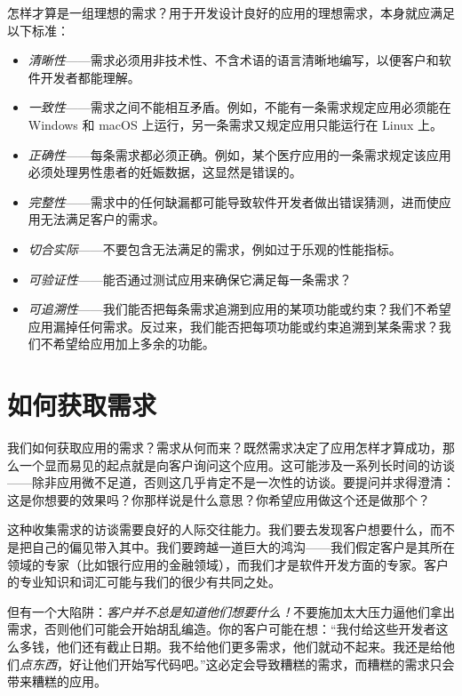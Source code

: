 怎样才算是一组理想的需求？用于开发设计良好的应用的理想需求，本身就应满足以下标准：

\begin{itemize}
\item \emph{清晰性}——需求必须用非技术性、不含术语的语言清晰地编写，以便客户和软件开发者都能理解。
\item \emph{一致性}——需求之间不能相互矛盾。例如，不能有一条需求规定应用必须能在 Windows 和 macOS 上运行，另一条需求又规定应用只能运行在 Linux 上。
\item \emph{正确性}——每条需求都必须正确。例如，某个医疗应用的一条需求规定该应用必须处理男性患者的妊娠数据，这显然是错误的。
\item \emph{完整性}——需求中的任何缺漏都可能导致软件开发者做出错误猜测，进而使应用无法满足客户的需求。
\item \emph{切合实际}——不要包含无法满足的需求，例如过于乐观的性能指标。
\item \emph{可验证性}——能否通过测试应用来确保它满足每一条需求？
\item \emph{可追溯性}——我们能否把每条需求追溯到应用的某项功能或约束？我们不希望应用漏掉任何需求。反过来，我们能否把每项功能或约束追溯到某条需求？我们不希望给应用加上多余的功能。
\end{itemize}


\section{如何获取需求}

我们如何获取应用的需求？需求从何而来？既然需求决定了应用怎样才算成功，那么一个显而易见的起点就是向客户询问这个应用。这可能涉及一系列长时间的访谈——除非应用微不足道，否则这几乎肯定不是一次性的访谈。要提问并求得澄清：这是你想要的效果吗？你那样说是什么意思？你希望应用做这个还是做那个？

这种收集需求的访谈需要良好的人际交往能力。我们要去发现客户想要什么，而不是把自己的偏见带入其中。我们要跨越一道巨大的鸿沟——我们假定客户是其所在领域的专家（比如银行应用的金融领域），而我们才是软件开发方面的专家。客户的专业知识和词汇可能与我们的很少有共同之处。

但有一个大陷阱：\emph{客户并不总是知道他们想要什么！}不要施加太大压力逼他们拿出需求，否则他们可能会开始胡乱编造。你的客户可能在想：“我付给这些开发者这么多钱，他们还有截止日期。我不给他们更多需求，他们就动不起来。我还是给他们\emph{点东西}，好让他们开始写代码吧。”这必定会导致糟糕的需求，而糟糕的需求只会带来糟糕的应用。

